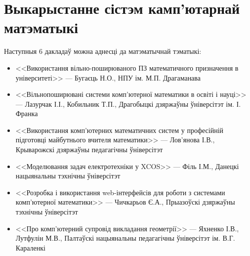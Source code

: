 \documentclass[10pt, a5paper]{article}
\begin{document}
\section{Выкарыстанне сістэм камп'ютарнай матэматыкі}
Наступныя 6 дакладаў можна аднесці да матэматычнай тэматыкі:
\begin{itemize}
\item <<Використання вільно-поширюваного ПЗ математичного призначення в університеті>> --- Бугаєць Н.О., НПУ ім. М.П. Драгаманава
\item <<Вільнопоширювані системи комп'ютерної математики в освіті і науці>> --- Лазурчак І.І., Кобильник Т.П., Драгобыцкі дзяржаўны ўніверсітэт ім. І. Франка
\item <<Використання комп'ютерних математичних систем у професійній підготовці майбутнього вчителя математики>> --- Лов'янова І.В., Крыварожскі дзяржаўны педагагічны ўніверсітэт
\item <<Моделювання задач електротехніки у XCOS>> --- Філь І.М., Данецкі нацыянальны тэхнічны ўніверсітэт
\item <<Розробка і використання web-інтерфейсів для роботи з системами комп'ютерної математики>> --- Чичкарьов Є.А., Прыазоўскі дзяржаўны тэхнічны ўніверсітэт
\item <<Про комп'ютерний супровід викладання геометрії>> --- Яхненко І.В., Лутфулін М.В., Палтаўскі нацыянальны педагагічны ўніверсітэт ім. В.Г. Караленкі
\end{itemize}
\end{document}
